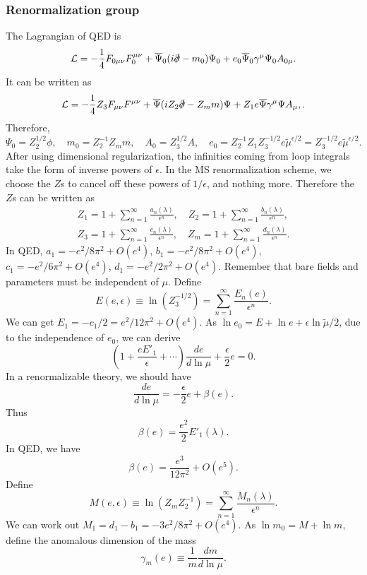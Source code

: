 \subsubsection{Renormalization group}
The Lagrangian of QED is
\[\mathcal{L} = -\frac{1}{4}F_{0\mu\nu}F_0^{\mu\nu} + \overline{\Psi}_0 (i\slashed{\partial}-m_0) \Psi_0 + e_0\overline{\Psi}_0\gamma^{\mu}\Psi_0 A_{0\mu}.\]
It can be written as
\[\mathcal{L} = -\frac{1}{4} Z_3 F_{\mu\nu}F^{\mu\nu} + \overline{\Psi} (iZ_2 \slashed{\partial}-Z_m m) \Psi + Z_1 e\overline{\Psi}\gamma^{\mu}\Psi A_{\mu}, .\]
Therefore,
\[\Psi_0 = Z_{2}^{1/2}\phi , \quad m_0 = Z_{2}^{-1} Z_{m}m , \quad A_0 = Z_3^{1/2}A , \quad e_0 = Z_{2}^{-1}Z_1 Z_{3}^{-1/2} e \tilde{\mu}^{\epsilon/2} = Z_{3}^{-1/2} e \tilde{\mu}^{\epsilon/2}.\]
After using dimensional regularization, the infinities coming from loop integrals take the form of inverse powers of $\epsilon$. 
In the  $\mathrm{\overline{MS}}$ renormalization scheme, we choose the $Z$s to cancel off these powers of $1/\epsilon$, and nothing more. Therefore the $Z$s can be written as
\begin{eqnarray}
Z_{1} = 1 + \sum_{n=1}^{\infty} \frac{a_n(\lambda)}{\epsilon^n} , \quad Z_{2} = 1 + \sum_{n=1}^{\infty} \frac{b_n(\lambda)}{\epsilon^n} ,\nonumber \\
Z_{3} = 1 + \sum_{n=1}^{\infty} \frac{c_n(\lambda)}{\epsilon^n} , \quad Z_{m} = 1 + \sum_{n=1}^{\infty} \frac{d_n(\lambda)}{\epsilon^n} .\nonumber 
\end{eqnarray}
In QED, $a_1 = -{e^2}/{8\pi^2} + O(e^4)$, $b_1 = -{e^2}/{8\pi^2} + O(e^4)$, $c_1 = -{e^2}/{6\pi^2} + O(e^4)$, $d_1 = -{e^2}/{2\pi^2} + O(e^4)$.
Remember that bare fields and parameters must be independent of $\mu$.
Define
\[E(e,\epsilon) \equiv \ln(Z_3^{-1/2}) = \sum_{n=1}^{\infty} \frac{E_n(e)}{\epsilon^n}.\]
We can get $E_1 = -{c_1}/{2} = {e^2}/{12\pi^2} + O(e^4)$.
As $\ln e_0 = E + \ln e + {\epsilon \ln \tilde{\mu}}/{2} $, due to the independence of $e_0$, we can derive
\[\left ( 1 + \frac{e E'_1}{\epsilon} + \cdots \right) \frac{d e}{d\ln \mu} + \frac{\epsilon}{2} e = 0.\]
In a renormalizable theory, we should have
\[\frac{d e}{d\ln\mu} = -\frac{\epsilon}{2} e + \beta(e).\]
Thus
\[\beta(e) = \frac{e^2}{2} E'_1(\lambda).\]
In QED, we have
\[\beta(e) = \frac{e^3}{12\pi^2} + O(e^5).\]
Define
\[M(e,\epsilon) \equiv \ln(Z_{m} Z_{2}^{-1}) = \sum_{n=1}^{\infty} \frac{M_n(\lambda)}{\epsilon^n}.\]
We can work out $M_1 = d_1 - b_1 = -{3e^2}/{8\pi^2} + O(e^4)$.
As $\ln m_0 = M + \ln m $, define the anomalous dimension of the mass
\[\gamma_m(e) \equiv \frac{1}{m} \frac{dm}{d \ln \mu}.\]
